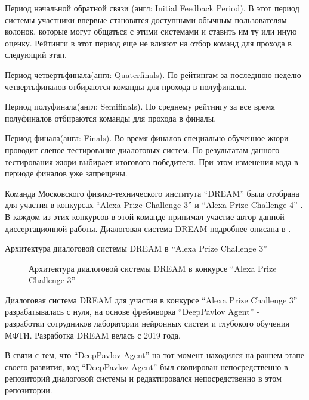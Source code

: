 Период начальной обратной связи (англ: Initial Feedback Period). В этот период системы-участники впервые становятся доступными обычным пользователям колонок, которые могут общаться с этими системами и ставить им ту или иную оценку. Рейтинги в этот период еще не влияют на отбор команд для прохода в следующий этап.

Период четвертьфинала(англ: Quaterfinals). По рейтингам за последнюю неделю четвертьфиналов отбираются команды для прохода в полуфиналы.

Период полуфинала(англ: Semifinals). По среднему рейтингу за все время полуфиналов отбираются команды для прохода в финалы.

Период финала(англ: Finals). Во время финалов специально обученное жюри проводит слепое тестирование диалоговых систем. По результатам данного тестирования жюри выбирает итогового победителя. При этом изменения кода в периоде финалов уже запрещены.


Команда Московского физико-технического института “DREAM” была отобрана для участия в конкурсах “Alexa Prize Challenge 3” \cite{Alexa Prize SocialBot Grand Challenge 3 - Amazon Science} и “Alexa Prize Challenge 4” \cite{Alexa Prize SocialBot Grand Challenge 4 - Amazon Science}. В каждом из этих конкурсов \cite{DREAM Team / Alexa Prize 3,DREAM Team / Alexa Prize 4} в этой команде принимал участие автор данной диссертационной работы. Диалоговая система DREAM подробнее описана в \cite{Baymurzina_Kuznetsov_Evseev_Karpov_Sagirova_Peganov_Ignatov_Ermakova_Cherniavskii_Kumeyko_et al._2021,Kuratov_Yusupov_Baymurzina_Kuznetsov_Cherniavskii_Dmitrievskiy_Ermakova_Ignatov_Karpov_Kornev_et al._2019, 2021}.

Архитектура диалоговой системы DREAM в “Alexa Prize Challenge 3”

\begin{figure}[ht]
  \caption{Архитектура диалоговой системы DREAM в конкурсе “Alexa Prize Challenge 3”}\label{fig:dream1}
\end{figure}


Диалоговая система DREAM для участия в конкурсе “Alexa Prize Challenge 3” разрабатывалась с нуля, на основе фреймворка “DeepPavlov Agent” -  разработки сотрудников лаборатории нейронных систем и глубокого обучения МФТИ. Разработка DREAM велась с 2019 года.

В связи с тем, что “DeepPavlov Agent” на тот момент находился на раннем этапе своего развития, код “DeepPavlov Agent” был скопирован непосредственно в репозиторий диалоговой системы и редактировался непосредственно в этом репозитории.  

